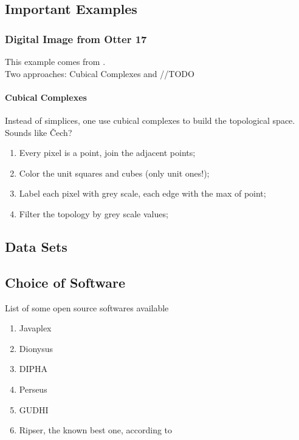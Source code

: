 \documentclass[10pt,a4paper]{article}
\begin{document}
\subsection{Important Examples}
\subsubsection{Digital Image from Otter 17}
This example comes from \cite{Otter2017}.\\
Two approaches: Cubical Complexes and //TODO
\paragraph{Cubical Complexes}
Instead of simplices, one use cubical complexes to build the topological space.\\
Sounds like \v Cech?\\
\begin{enumerate}
	\item Every pixel is a point, join the adjacent points;
	\item Color the unit squares and cubes (only unit ones!);
	\item Label each pixel with grey scale, each edge with the max of point;
	\item Filter the topology by grey scale values;
	
\end{enumerate}
\subsection{Data Sets}
\subsection{Choice of Software}
List of some open source softwares available
\begin{enumerate}
	\item Javaplex\cite{Javaplex}
	\item Dionysus
	\item DIPHA
	\item Perseus
	\item GUDHI
	\item Ripser, the known best one, according to \cite{Otter2017}
\end{enumerate}


\newpage


\end{document}
